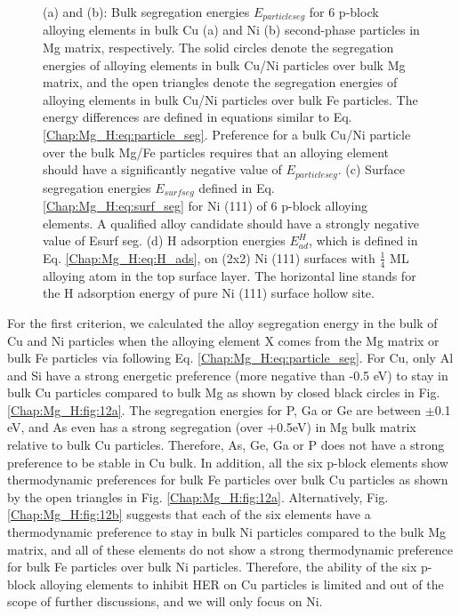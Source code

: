 \begin{figure}[!ht]
\caption[Effects of 6 p-block elements on other precipitates(Cu and Ni)]{(a) and (b): Bulk segregation energies $E_{particle seg}$ for 6 p-block alloying elements in bulk Cu (a) and Ni (b) second-phase particles in Mg matrix, respectively. The solid circles denote the segregation energies of alloying elements in bulk Cu/Ni particles over bulk Mg matrix, and the open triangles denote the segregation energies of alloying elements in bulk Cu/Ni particles over bulk Fe particles. The energy differences are defined in equations similar to Eq. \ref{Chap:Mg_H:eq:particle_seg}. Preference for a bulk Cu/Ni particle over the bulk Mg/Fe particles requires that an alloying element should have a significantly negative value of $E_{particle seg}$. (c) Surface segregation energies $E_{surf seg}$ defined in Eq. \ref{Chap:Mg_H:eq:surf_seg} for Ni (111) of 6 p-block alloying elements. A qualified alloy candidate should have a strongly negative value of Esurf seg. (d) H adsorption energies $E_{ad}^H$, which is defined in Eq. \ref{Chap:Mg_H:eq:H_ads}, on (2x2) Ni (111) surfaces with $\frac{1}{4}$ \ac{ML} alloying atom in the top surface layer. The horizontal line stands for the H adsorption energy of pure Ni (111) surface hollow site.}
  \label{Chap:Mg_H:fig12}
\end{figure}
\endgroup

For the first criterion, we calculated the alloy segregation energy in the bulk of Cu and Ni particles when the alloying element X comes from the Mg matrix or bulk Fe particles via following Eq. \ref{Chap:Mg_H:eq:particle_seg}. For Cu, only Al and Si have a strong energetic preference (more negative than -0.5 eV) to stay in bulk Cu particles compared to bulk Mg as shown by closed black circles in Fig. \ref{Chap:Mg_H:fig:12a}. The segregation energies for P, Ga or Ge are between $\pm$0.1 eV, and As even has a strong segregation (over +0.5eV) in Mg bulk matrix relative to bulk Cu particles.  Therefore, As, Ge, Ga or P does not have a strong preference to be stable in Cu bulk. In addition, all the six p-block elements show thermodynamic preferences for bulk Fe particles over bulk Cu particles as shown by the open triangles in Fig. \ref{Chap:Mg_H:fig:12a}. Alternatively, Fig. \ref{Chap:Mg_H:fig:12b} suggests that each of the six elements have a thermodynamic preference to stay in bulk Ni particles compared to the bulk Mg matrix, and all of these elements do not show a strong thermodynamic preference for bulk Fe particles over bulk Ni particles. Therefore, the ability of the six p-block alloying elements to inhibit HER on Cu particles is limited and out of the scope of further discussions, and we will only focus on Ni.


